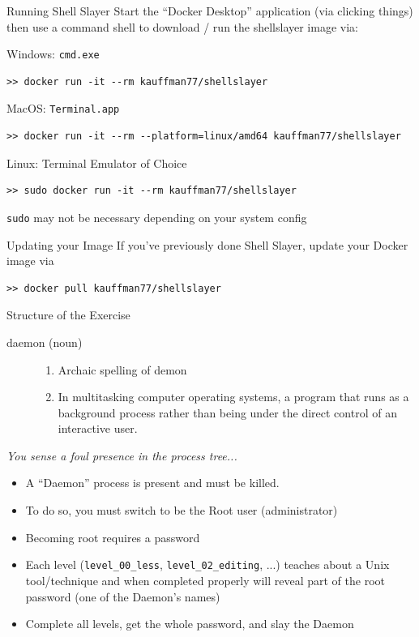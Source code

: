 \documentclass[mathserif]{beamer}
\begin{document}
\begin{frame}[label={sec:org77e6de9},fragile]{Running Shell Slayer}
 Start the ``Docker Desktop'' application (via clicking things) then use
a command shell to download / run the shellslayer image via:

\footnotesize
\begin{block}{Windows: \texttt{cmd.exe}}
\begin{verbatim}
>> docker run -it --rm kauffman77/shellslayer
\end{verbatim}
\end{block}
\begin{block}{MacOS: \texttt{Terminal.app}}
\begin{verbatim}
>> docker run -it --rm --platform=linux/amd64 kauffman77/shellslayer
\end{verbatim}
\end{block}
\begin{block}{Linux: Terminal Emulator of Choice}
\begin{verbatim}
>> sudo docker run -it --rm kauffman77/shellslayer
\end{verbatim}
\texttt{sudo} may not be necessary depending on your system config
\end{block}
\begin{block}{Updating your Image}
If you've previously done Shell Slayer, update your Docker image via
\begin{verbatim}
>> docker pull kauffman77/shellslayer
\end{verbatim}
\end{block}
\end{frame}
\begin{frame}[label={sec:org80956c0},fragile]{Structure of the Exercise}
 \begin{description}
\item[{daemon (noun)}] \begin{enumerate}
\item Archaic spelling of demon
\item In multitasking computer operating systems, a program that runs
as a background process rather than being under the direct
control of an interactive user.
\end{enumerate}
\end{description}

\normalsize
\emph{You sense a foul presence in the process tree...}
\begin{itemize}
\item A ``Daemon'' process is present and must be killed.
\item To do so, you must switch to be the Root user (administrator)
\item Becoming root requires a password
\item Each level (\texttt{level\_00\_less}, \texttt{level\_02\_editing}, ...) teaches about
a Unix tool/technique and when completed properly will reveal part
of the root password (one of the Daemon's names)
\item Complete all levels, get the whole password, and slay the
Daemon
\end{itemize}
\end{frame}
\end{document}
